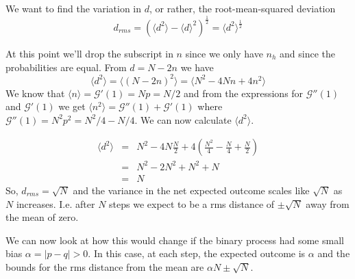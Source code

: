 \documentclass{article}
\newcommand{\calG}{\mathcal{G}}
\begin{document}
We want to find the variation in $d$, or rather, the root-mean-squared deviation 
$$d_{rms} = \left(\langle d^2\rangle - \langle d\rangle^2\right)^{\frac12} =  \langle d^2\rangle^{\frac12}$$

At this point we'll drop the subscript in $n$ since we only have $n_h$ and since the probabilities are equal. From $d=N-2n$ we have $$ \langle d^2\rangle = \langle (N-2n)^2\rangle = \langle N^2 -4Nn+4n^2\rangle$$
We know that $\langle n\rangle = \calG'(1)=Np=N/2$ and from the expressions for $\calG''(1)$ and $\calG'(1)$ we get $\langle n^2 \rangle = \calG''(1) + \calG'(1)$ where $\calG''(1) = N^2p^2 = N^2/4-N/4$. We can now calculate $\langle d^2 \rangle$.

\begin{eqnarray*}
	\langle d^2 \rangle &=& N^2 -4N\frac{N}{2}+4\left(\frac{N^2}{4}-\frac{N}{4}+\frac{N}{2}\right)\\
		&=& N^2-2N^2+N^2+N\\
		&=& N
\end{eqnarray*}
So, $d_{rms}=\sqrt{N}$ and the variance in the net expected outcome scales like $\sqrt{N}$ as $N$ increases. I.e. after $N$ steps we expect to be a rms distance of $\pm \sqrt{N}$ away from the mean of zero.

\begin{center}
\end{center}

We can now look at how this would change if the binary process had some small bias $\alpha = |p-q| >0$. In this case, at each step, the expected outcome is $\alpha$ and the bounds for the rms distance from the mean are $\alpha N\pm\sqrt{N}$. 

\begin{center}
\end{center}
\end{document}
